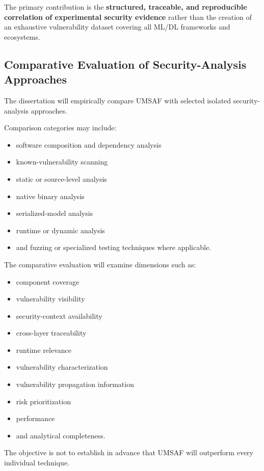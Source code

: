 \documentclass[
  12pt,
  letterpaper,
  oneside]{report}
\providecommand{\tightlist}{%
  \setlength{\itemsep}{0pt}\setlength{\parskip}{0pt}}
\begin{document}
The primary contribution is the \textbf{structured, traceable, and
reproducible correlation of experimental security evidence} rather than
the creation of an exhaustive vulnerability dataset covering all ML/DL
frameworks and ecosystems.

\subsection{Comparative Evaluation of Security-Analysis Approaches}\label{1232-comparative-evaluation-of-security-analysis-approaches}

The dissertation will empirically compare UMSAF with selected isolated
security-analysis approaches.

Comparison categories may include:

\begin{itemize}
\tightlist
\item
  software composition and dependency analysis
\item
  known-vulnerability scanning
\item
  static or source-level analysis
\item
  native binary analysis
\item
  serialized-model analysis
\item
  runtime or dynamic analysis
\item
  and fuzzing or specialized testing techniques where applicable.
\end{itemize}

The comparative evaluation will examine dimensions such as:

\begin{itemize}
\tightlist
\item
  component coverage
\item
  vulnerability visibility
\item
  security-context availability
\item
  cross-layer traceability
\item
  runtime relevance
\item
  vulnerability characterization
\item
  vulnerability propagation information
\item
  risk prioritization
\item
  performance
\item
  and analytical completeness.
\end{itemize}

The objective is not to establish in advance that UMSAF will outperform
every individual technique.
\end{document}
